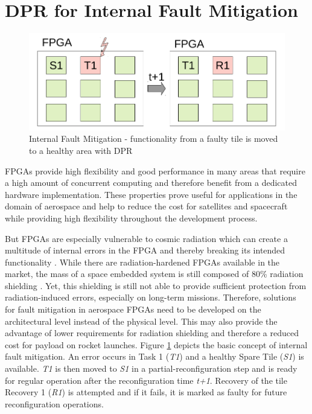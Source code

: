 \section{\gls{DPR} for Internal Fault Mitigation}\label{InternalFaults}
\begin{figure}
    \centering
    \includegraphics[width=\columnwidth]{graphics/faultyTile2.pdf}
    \caption{Internal Fault Mitigation - functionality from a faulty tile is moved to a healthy area with \gls{DPR}}\label{fig:internalFaultMitigation}
\end{figure}

%
\glspl{FPGA} provide high flexibility and good performance in many areas that require a high amount of concurrent computing and therefore benefit from a dedicated hardware implementation.
These properties prove useful for applications in the domain of aerospace and help to reduce the cost for satellites and spacecraft while providing high flexibility throughout the development process. 

But \glspl{FPGA} are especially vulnerable to cosmic radiation which can create a multitude of internal errors in the \gls{FPGA} and thereby breaking its intended functionality \cite{ito_total_2015}.
While there are radiation-hardened \glspl{FPGA} available in the market, the mass of a space embedded system is still composed of 80\% radiation shielding \cite{ito_total_2015}.
Yet, this shielding is still not able to provide sufficient protection from radiation-induced errors, especially on long-term missions. 
Therefore, solutions for fault mitigation in aerospace \glspl{FPGA} need to be developed on the architectural level instead of the physical level. 
This may also provide the advantage of lower requirements for radiation shielding and therefore a reduced cost for payload on rocket launches.
Figure \ref{fig:internalFaultMitigation} depicts the basic concept of internal fault mitigation. 
An error occurs in Task 1 (\textit{T1}) and a healthy Spare Tile (\textit{S1}) is available. 
\textit{T1} is then moved to \textit{S1} in a partial-reconfiguration step and is ready for regular operation after the reconfiguration time \textit{t+1}.
Recovery of the tile Recovery 1 (\textit{R1}) is attempted and if it fails, it is marked as faulty for future reconfiguration operations.

